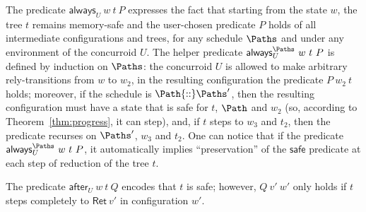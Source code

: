 The predicate $\mathsf{always}_U~w~t~P$ expresses the fact that
starting from the state $w$, the tree $t$ remains memory-safe and the
user-chosen predicate $P$ holds of all intermediate configurations and
trees, for any schedule $\Paths$ and under any environment of the
concurroid $U$. %
The helper predicate $\mathsf{always}^{\Paths}_U~w~t~P$ is defined by
induction on $\Paths$: the concurroid $U$ is allowed to make arbitrary
rely-transitions from $w$ to $w_2$, in the resulting configuration the
predicate $P~w_2~t$ holds; moreover, if the schedule is $\Path {::}
\Paths'$, then the resulting configuration must have a state that is
\textsf{safe} for $t$, $\Path$ and $w_2$ (so, according to
Theorem~\ref{thm:progress}, it can step), and, if $t$ steps to $w_3$
and $t_2$, then the predicate recurses on $\Paths'$, $w_3$ and
$t_2$. One can notice that if the predicate
$\mathsf{always}^{\Paths}_U~w~t~P$, it automatically implies
``preservation'' of the $\mathsf{safe}$ predicate at each step of
reduction of the tree $t$.

The predicate $\mathsf{after}_U~w~t~Q$ encodes that $t$ is \textsf{safe};
however, $Q\ v'\ w'$ only holds if $t$ steps completely to
$\mathsf{Ret}\ v'$ in configuration $w'$.

